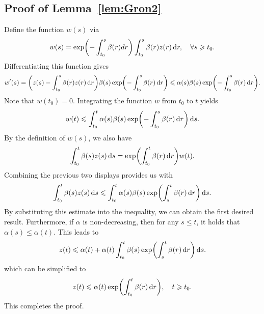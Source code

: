 \subsection{Proof of Lemma~\ref{lem:Gron2}}
Define the function $w(s)$ via
\begin{align*}
    w(s)=\exp\left(-\int_{t_0}^s\beta(r)dr\right)\int_{t_0}^s\beta(r)z(r)\rmd r,\quad \forall s\geqslant t_0.
\end{align*}
Differentiating this function gives
\begin{align*}
    w'(s)=\left(z(s)-\int_{t_0}^s\beta(r)z(r)\rmd r\right)\beta(s)\exp\left(-\int_{t_0}^s\beta(r)\rmd r\right)\leqslant \alpha(s)\beta(s)\exp\left(-\int_{t_0}^s\beta(r)\rmd r\right).
\end{align*}
Note that $w(t_0)=0$. Integrating the function $w$ from $t_0$ to $t$ yields
\begin{align*}
    w(t)\leqslant \int_{t_0}^t\alpha(s)\beta(s)\exp\left(-\int_{t_0}^s\beta(r)\rmd r\right)\rmd s.
\end{align*}
By the definition of $w(s)$, we also have
\begin{align*}
    \int_{t_0}^t\beta(s)z(s)\rmd s=\exp\left(\int_{t_0}^t\beta(r)\rmd r\right)w(t).
\end{align*}
Combining the previous two displays provides us with
\begin{align*}
    \int_{t_0}^t\beta(s)z(s)\rmd s\leqslant\int_{t_0}^t\alpha(s)\beta(s)\exp\left(\int_s^t\beta(r)\rmd r\right)\rmd s.
\end{align*}
By substituting this estimate into the inequality, we can obtain the first desired result.
Furthermore, if $\alpha$ is non-decreasing, then for any $s\leqslant t$, it holds that $\alpha(s)\leqslant \alpha(t)$.
This leads to 
\begin{align*}
    z(t)\leqslant \alpha(t)+\alpha(t)\int_{t_0}^t\beta(s)\exp\left(\int_s^t\beta(r)\rmd r\right)\rmd s.
\end{align*}
which can be simplified to
\begin{align*}
    z(t)\leqslant \alpha(t)\exp\left(\int_{t_0}^t\beta(r)\rmd r\right),\quad t\geqslant t_0.
\end{align*}
This completes the proof.

